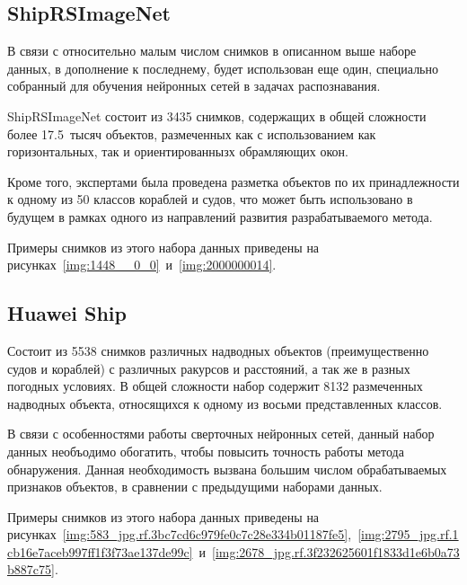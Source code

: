 
\subsection*{ShipRSImageNet}

В связи с относительно малым числом снимков в описанном выше наборе данных, в дополнение к последнему, будет использован еще один, специально собранный для обучения нейронных сетей в задачах распознавания.

ShipRSImageNet состоит из 3435 снимков, содержащих в общей сложности более 17.5~тысяч объектов, размеченных как с использованием как горизонтальных, так и ориентированнызх обрамляющих окон. 

Кроме того, экспертами была проведена разметка объектов по их принадлежности к одному из 50 классов кораблей и судов, что может быть использовано в будущем в рамках одного из направлений развития разрабатываемого метода.

Примеры снимков из этого набора данных приведены на рисунках~\ref{img:1448__0_0}~и~\ref{img:2000000014}.



\subsection*{Huawei Ship}

Состоит из 5538 снимков различных надводных объектов (преимущественно судов и кораблей) с различных ракурсов и расстояний, а так же в разных погодных условиях. В общей сложности набор содержит 8132 размеченных надводных объекта, относящихся к одному из восьми представленных классов. 

В связи с особенностями работы сверточных нейронных сетей, данный набор данных необъодимо обогатить, чтобы повысить точность работы метода обнаружения. Данная необходимость вызвана большим числом обрабатываемых признаков объектов, в сравнении с предыдущими наборами данных.

Примеры снимков из этого набора данных приведены на рисунках~\ref{img:583_jpg.rf.3bc7cd6c979fe0c7c28e334b01187fe5},~\ref{img:2795_jpg.rf.1cb16e7aceb997ff1f3f73ae137de99c}~и~\ref{img:2678_jpg.rf.3f232625601f1833d1e6b0a73b887c75}.

